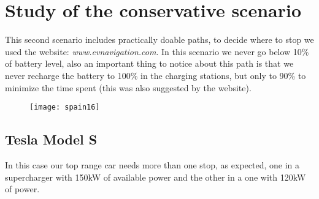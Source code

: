\documentclass{article}
\begin{document}
{}
\newpage
\section{Study of the conservative scenario}
This second scenario includes practically doable paths, to decide where to stop we used the website: \textit{www.evnavigation.com}. In this scenario we never go below 10\% of battery level, also an important thing to notice about this path is that we never recharge the battery to 100\% in the charging stations, but only to 90\% to minimize the time spent (this was also suggested by the website).
\begin{figure}[H]
\centering
\texttt{[image: spain16]}
\end{figure}
{}
\color{black}
\subsection{Tesla Model S}
In this case our top range car needs more than one stop, as expected, one in a supercharger with 150kW of available power and the other in a one with 120kW of power.
\\
\end{document}
